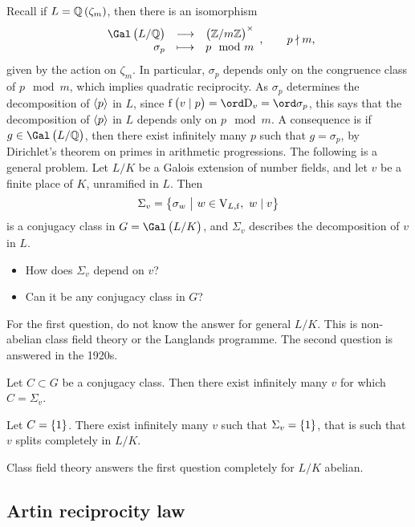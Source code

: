 
Recall if $ L = \QQ\br{\zeta_m} $, then there is an isomorphism
$$ \function{\Gal\br{L / \QQ}}{\br{\ZZ / m\ZZ}^\times}{\sigma_p}{p \mod m}, \qquad p \nmid m, $$
given by the action on $ \zeta_m $. In particular, $ \sigma_p $ depends only on the congruence class of $ p \mod m $, which implies quadratic reciprocity. As $ \sigma_p $ determines the decomposition of $ \left\langle p \right\rangle $ in $ L $, since $ \f\br{v \mid p} = \ord \D_v = \ord \sigma_p $, this says that the decomposition of $ \left\langle p \right\rangle $ in $ L $ depends only on $ p \mod m $. A consequence is if $ g \in \Gal\br{L / \QQ} $, then there exist infinitely many $ p $ such that $ g = \sigma_p $, by Dirichlet's theorem on primes in arithmetic progressions. The following is a general problem. Let $ L / K $ be a Galois extension of number fields, and let $ v $ be a finite place of $ K $, unramified in $ L $. Then
$$ \Sigma_v = \cbr{\sigma_w \st w \in \V_{L, \f}, \ w \mid v} $$
is a conjugacy class in $ G = \Gal\br{L / K} $, and $ \Sigma_v $ describes the decomposition of $ v $ in $ L $.
\begin{itemize}
\item How does $ \Sigma_v $ depend on $ v $?
\item Can it be any conjugacy class in $ G $?
\end{itemize}

For the first question, do not know the answer for general $ L / K $. This is non-abelian class field theory or the Langlands programme. The second question is answered in the 1920s.

\begin{theorem*}
Let $ C \subset G $ be a conjugacy class. Then there exist infinitely many $ v $ for which $ C = \Sigma_v $.
\end{theorem*}

\begin{example*}
Let $ C = \cbr{1} $. There exist infinitely many $ v $ such that $ \Sigma_v = \cbr{1} $, that is such that $ v $ splits completely in $ L / K $.
\end{example*}

Class field theory answers the first question completely for $ L / K $ abelian.

\subsection{Artin reciprocity law}

